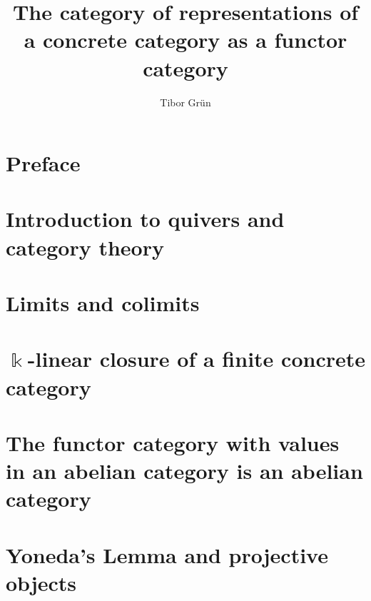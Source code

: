 \documentclass{article}
\title{The category of representations of a concrete category as a functor category}
\author{Tibor Gr{\"u}n}
\begin{document}

	\maketitle

	\newpage

	\tableofcontents\label{toc}
	
	\newpage

	
\section*{Preface}

\newpage
{}
\phantom{}%
\newpage
{}
\section{Introduction to quivers and category theory}


\newpage
\section{Limits and colimits}


\newpage
\section{$\Bbbk$-linear closure of a finite concrete category}


%

\newpage
\section{The functor category with values in an abelian category is an abelian category}


\newpage
\section{Yoneda's Lemma and projective objects}

\end{document}
